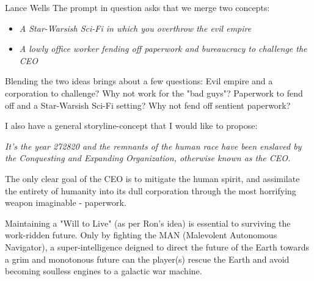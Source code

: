 \documentclass[12pt]{report}
\begin{document}
\begin{section}{Lance Wells}
The prompt in question asks that we merge two concepts:
\begin{itemize}
\item \emph{A Star-Warsish Sci-Fi in which you overthrow the evil empire}
\item \emph{A lowly office worker fending off paperwork and bureaucracy to challenge the CEO}
\end{itemize}

Blending the two ideas brings about a few questions:
Evil empire and a corporation to challenge? Why not work for the "bad 
guys"? Paperwork to fend off and a Star-Warsish Sci-Fi setting? Why not fend off 
sentient paperwork?

I also have a general storyline-concept that I would like to propose:\newline
\begin{center}
\emph{It's the year 272820 and the remnants of the human race have been enslaved by 
the Conquesting and Expanding Organization, otherwise known as the CEO.}
\end{center}

The only clear goal of the CEO is to mitigate the human spirit, and assimilate the entirety 
of humanity into its dull corporation through the most horrifying weapon imaginable - paperwork.

Maintaining a "Will to Live" (as per Ron's idea) is essential to surviving the work-ridden 
future. Only by fighting the MAN (Malevolent Autonomous Navigator), a super-intelligence deigned 
to direct the future of the Earth towards a grim and monotonous future can the player(s) rescue 
the Earth and avoid becoming soulless engines to a galactic war machine.
\end{section}
\end{document}
